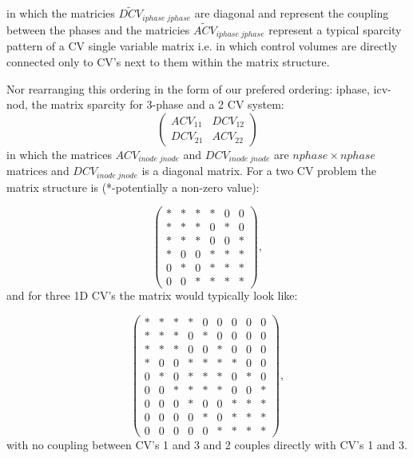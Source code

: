 in which the matricies $\widetilde {DCV}_{iphase\; jphase}$ are diagonal and represent the 
coupling between the phases and the matricies $\widetilde {ACV}_{iphase\; jphase}$ represent 
a typical sparcity pattern of a CV single variable matrix i.e. in which control volumes are 
directly connected only to CV's next to them within the matrix structure. 

Nor rearranging this ordering in the form of our prefered ordering:  iphase, icv-nod, 
the matrix sparcity for 3-phase and a 2 CV system:
\begin{equation}
  \begin{pmatrix}
ACV_{11}  &  DCV_{12}   \\
DCV_{21}  &  ACV_{22} 
  \end{pmatrix}
\label{CV-mat-spar}
\end{equation}
in which the matrices $ACV_{inode\; jnode}$ and $DCV_{inode\; jnode}$ are $nphase \times nphase$ matrices and $DCV_{inode\; jnode}$ 
is a diagonal matrix. 
For 
a two CV problem the matrix structure is (*-potentially a non-zero value): 

\begin{equation}
  \begin{pmatrix}
*  &  *  &  *      &   *   &  0  &  0  \\ 
*  &  *  &  *      &   0   &  *  &  0  \\ 
*  &  *  &  *      &   0   &  0  &  *  \\ 
%
*  &  0  &  0      &   *   &  *  &  *  \\
0  &  *  &  0      &   *   &  *  &  *  \\
0  &  0  &  *      &   *   &  *  &  *  
  \end{pmatrix},
\label{optimal-CV-mat-spar}
\end{equation}
and for three 1D CV's the matrix would typically look like: 

\begin{equation}
  \begin{pmatrix}
*  &  *  &  *      &   *   &  0  &  0    &   0   &  0  &  0   \\ 
*  &  *  &  *      &   0   &  *  &  0    &   0   &  0  &  0  \\ 
*  &  *  &  *      &   0   &  0  &  *    &   0   &  0  &  0  \\ 
%
*  &  0  &  0      &   *   &  *  &  *    &   *   &  0  &  0  \\
0  &  *  &  0      &   *   &  *  &  *    &   0   &  *  &  0  \\
0  &  0  &  *      &   *   &  *  &  *    &   0   &  0  &  *  \\
%
0  &  0  &  0      &   *   &  0  &  0    &   *   &  *  &  *  \\
0  &  0  &  0      &   0   &  *  &  0    &   *   &  *  &  *  \\
0  &  0  &  0      &   0   &  0  &  *    &   *   &  *  &  *  
  \end{pmatrix},
\label{optimal-CV-mat-spar-3CV}
\end{equation}
with no coupling between CV's 1 and 3 and 2 couples directly with CV's 
1 and 3. 



